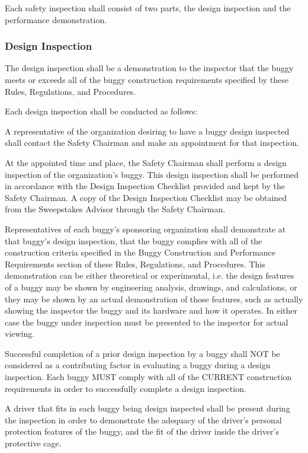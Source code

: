 \documentclass[openany]{book}
\begin{document}
Each safety inspection shall consist of two parts, the design inspection and the performance demonstration.

\subsubsection{Design Inspection}

The design inspection shall be a demonstration to the inspector that the buggy meets or exceeds all of the buggy construction requirements specified by these Rules, Regulations, and Procedures.

Each design inspection shall be conducted as follows:

A representative of the organization desiring to have a buggy design inspected shall contact the Safety Chairman and make an appointment for that inspection.

At the appointed time and place, the Safety Chairman shall perform a design inspection of the organization's buggy. This design inspection shall be performed in accordance with the Design Inspection Checklist provided and kept by the Safety Chairman. A copy of the Design Inspection Checklist may be obtained from the Sweepstakes Advisor through the Safety Chairman.

Representatives of each buggy's sponsoring organization shall demonstrate at that buggy's design inspection, that the buggy complies with all of the construction criteria specified in the Buggy Construction and Performance Requirements section of these Rules, Regulations, and Procedures. This demonstration can be either theoretical or experimental, i.e. the design features of a buggy may be shown by engineering analysis, drawings, and calculations, or they may be shown by an actual demonstration of those features, such as actually showing the inspector the buggy and its hardware and how it operates. In either case the buggy under inspection must be presented to the inspector for actual viewing.

Successful completion of a prior design inspection by a buggy shall NOT be considered as a contributing factor in evaluating a buggy during a design inspection. Each buggy MUST comply with all of the CURRENT construction requirements in order to successfully complete a design inspection.

A driver that fits in each buggy being design inspected shall be present during the inspection in order to demonstrate the adequacy of the driver's personal protection features of the buggy, and the fit of the driver inside the driver's protective cage.
\end{document}
